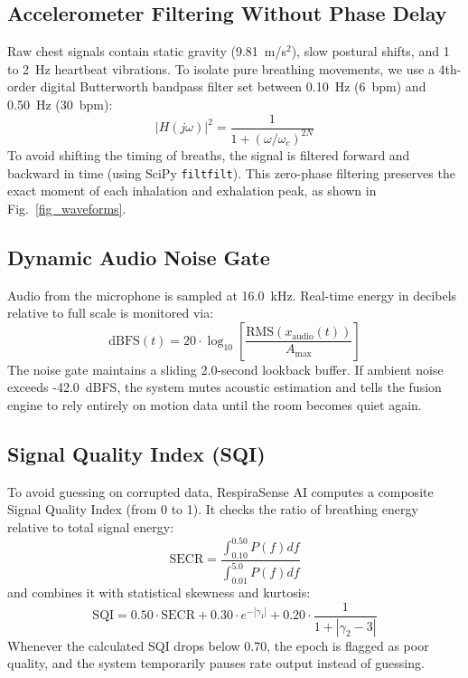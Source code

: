 \documentclass[journal]{IEEEtran}
\begin{document}
\subsection{Accelerometer Filtering Without Phase Delay}
Raw chest signals contain static gravity (9.81~m/s$^2$), slow postural shifts, and 1 to 2~Hz heartbeat vibrations. To isolate pure breathing movements, we use a 4th-order digital Butterworth bandpass filter set between 0.10~Hz (6~bpm) and 0.50~Hz (30~bpm):
\begin{equation}
|H(j\omega)|^2 = \frac{1}{1 + (\omega / \omega_c)^{2N}}
\end{equation}
To avoid shifting the timing of breaths, the signal is filtered forward and backward in time (using SciPy \texttt{filtfilt}). This zero-phase filtering preserves the exact moment of each inhalation and exhalation peak, as shown in Fig.~\ref{fig_waveforms}.

\subsection{Dynamic Audio Noise Gate}
Audio from the microphone is sampled at 16.0~kHz. Real-time energy in decibels relative to full scale is monitored via:
\begin{equation}
\text{dBFS}(t) = 20 \cdot \log_{10} \left[ \frac{\text{RMS}(x_{\text{audio}}(t))}{A_{\text{max}}} \right]
\end{equation}
The noise gate maintains a sliding 2.0-second lookback buffer. If ambient noise exceeds -42.0~dBFS, the system mutes acoustic estimation and tells the fusion engine to rely entirely on motion data until the room becomes quiet again.

\subsection{Signal Quality Index (SQI)}
To avoid guessing on corrupted data, RespiraSense AI computes a composite Signal Quality Index (from 0 to 1). It checks the ratio of breathing energy relative to total signal energy:
\begin{equation}
\text{SECR} = \frac{\int_{0.10}^{0.50} P(f) df}{\int_{0.01}^{5.0} P(f) df}
\end{equation}
and combines it with statistical skewness and kurtosis:
\begin{equation}
\text{SQI} = 0.50 \cdot \text{SECR} + 0.30 \cdot e^{-|\gamma_1|} + 0.20 \cdot \frac{1}{1 + |\gamma_2 - 3|}
\end{equation}
Whenever the calculated SQI drops below 0.70, the epoch is flagged as poor quality, and the system temporarily pauses rate output instead of guessing.
\end{document}
